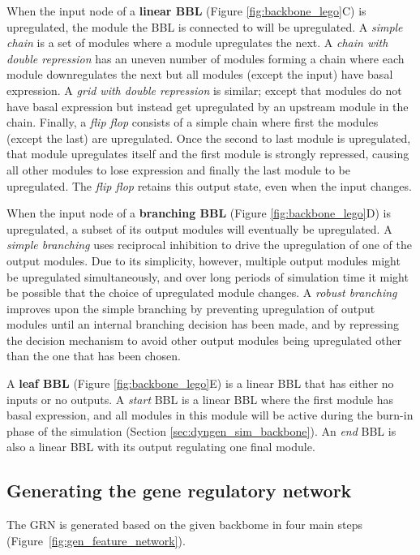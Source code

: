 When the input node of a \textbf{linear BBL} (Figure \ref{fig:backbone_lego}C) is upregulated, the module the BBL is connected to will be upregulated. A \emph{simple chain} is a set of modules where a module upregulates the next. A \emph{chain with double repression} has an uneven number of modules forming a chain where each module downregulates the next but all modules (except the input) have basal expression. A \emph{grid with double repression} is similar; except that modules do not have basal expression but instead get upregulated by an upstream module in the chain. Finally, a \emph{flip flop} consists of a simple chain where first the modules (except the last) are upregulated. Once the second to last module is upregulated, that module upregulates itself and the first module is strongly repressed, causing all other modules to lose expression and finally the last module to be upregulated. The \emph{flip flop} retains this output state, even when the input changes.

When the input node of a \textbf{branching BBL} (Figure \ref{fig:backbone_lego}D) is upregulated, a subset of its output modules will eventually be upregulated. A \emph{simple branching} uses reciprocal inhibition to drive the upregulation of one of the output modules. Due to its simplicity, however, multiple output modules might be upregulated simultaneously, and over long periods of simulation time it might be possible that the choice of upregulated module changes. A \emph{robust branching} improves upon the simple branching by preventing upregulation of output modules until an internal branching decision has been made, and by repressing the decision mechanism to avoid other output modules being upregulated other than the one that has been chosen.

A \textbf{leaf BBL} (Figure \ref{fig:backbone_lego}E) is a linear BBL that has either no inputs or no outputs. A \emph{start} BBL is a linear BBL where the first module has basal expression, and all modules in this module will be active during the burn-in phase of the simulation (Section \ref{sec:dyngen_sim_backbone}). An \emph{end} BBL is also a linear BBL with its output regulating one final module. 


\subsection{Generating the gene regulatory network}
The GRN is generated based on the given backbome in four main steps (Figure~\ref{fig:gen_feature_network}).

